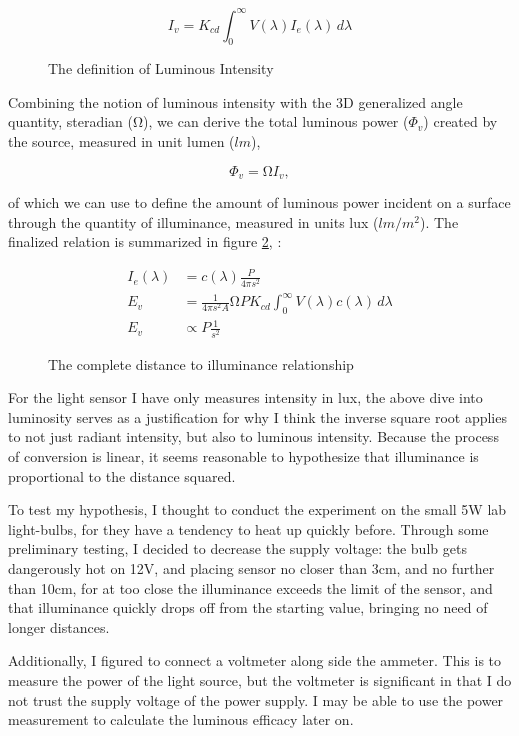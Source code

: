 \documentclass[a4paper,12pt]{article}
\begin{document}
\begin{figure}[h!]
    \[
     I_v = K_{cd} \int_{0}^{\infty} V(\lambda) I_e(\lambda) \, d\lambda
    \]
    \caption{The definition of Luminous Intensity}
    \label{eq:li}
\end{figure}

Combining the notion of luminous intensity with the 3D generalized angle quantity, steradian ($\si{\ohm}$), we can derive the total luminous power ($\Phi_v$) created by the source, measured in unit lumen ($\si{lm}$),

\[
    \Phi_v = \si{\ohm} I_v,
\]

of which we can use to define the amount of luminous power incident on a surface through the quantity of illuminance, measured in units lux ($\si{lm\per m^2}$). The finalized relation is summarized in figure \ref{eq:dti}, \parencite{intensityLuminous_se}:

\begin{figure}[h!]
 \centering
 \begin{align*}
 I_e(\lambda) &= c(\lambda) \frac{P}{4\pi s^2}\\
  E_v &= \frac{1}{4\pi s^2 A} \si{\ohm} P K_{cd} \int_{0}^{\infty} V(\lambda) c(\lambda) \, d\lambda\\
  E_v & \propto P\frac{1}{s^2}
 \end{align*}
 \caption{The complete distance to illuminance relationship}
 \label{eq:dti}
\end{figure}

For the light sensor I have only measures intensity in lux, the above dive into luminosity serves as a justification for why I think the inverse square root applies to not just radiant intensity, but also to luminous intensity. Because the process of conversion is linear, it seems reasonable to hypothesize that illuminance is proportional to the distance squared.

To test my hypothesis, I thought to conduct the experiment on the small 5W lab light-bulbs, for they have a tendency to heat up quickly before. Through some preliminary testing, I decided to decrease the supply voltage: the bulb gets dangerously hot on 12V, and placing sensor no closer than 3cm, and no further than 10cm, for at too close the illuminance exceeds the limit of the sensor, and that illuminance quickly drops off from the starting value, bringing no need of longer distances.

Additionally, I figured to connect a voltmeter along side the ammeter. This is to measure the power of the light source, but the voltmeter is significant in that I do not trust the supply voltage of the power supply. I may be able to use the power measurement to calculate the luminous efficacy later on.
\end{document}

